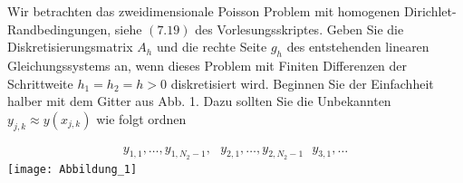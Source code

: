 \begin{exercise}
  Wir betrachten das zweidimensionale Poisson Problem mit homogenen
  Dirichlet-Randbedingungen, siehe $(7.19)$ des Vorlesungsskriptes. Geben Sie
  die Diskretisierungsmatrix $A_h$ und die rechte Seite $g_h$ des entstehenden
  linearen Gleichungssystems an, wenn dieses Problem mit Finiten Differenzen der
  Schrittweite $h_1 = h_2 = h > 0$ diskretisiert wird. Beginnen Sie der Einfachheit
  halber mit dem Gitter aus Abb. 1. Dazu sollten Sie die Unbekannten
  $y_{j,k} \approx y(x_{j,k})$ wie folgt ordnen

  \begin{align}\label{sec}
    y_{1,1}, \dots , y_{1,N_2 -1}, \text{ }
    y_{2,1}, \dots , y_{2,N_2 -1} \text{ }
    y_{3,1}, \dots
  \end{align}
  \texttt{[image: Abbildung\_1]}
  \end{exercise}

